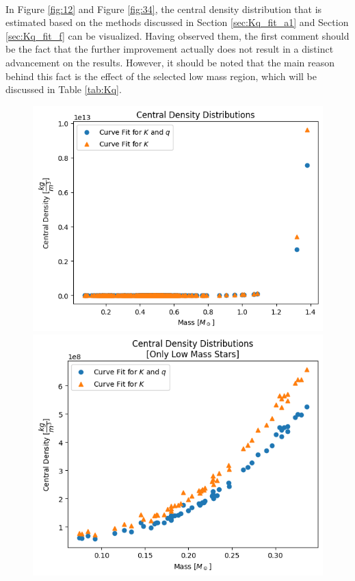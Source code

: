 \documentclass[letterpaper,12pt]{article}
\begin{document}
\paragraph{} In Figure \ref{fig:12} and Figure \ref{fig:34}, the central density distribution that is estimated based on the methods discussed in Section \ref{sec:Kq_fit_a1} and Section \ref{sec:Kq_fit_f} can be visualized. Having observed them, the first comment should be the fact that the further improvement actually does not result in a distinct advancement on the results. However, it should be noted that the main reason behind this fact is the effect of the selected low mass region, which will be discussed in Table \ref{tab:Kq}.

\begin{figure}[H]
\begin{minipage}{.5\textwidth}
\centerline{\includegraphics[width=\linewidth]{figures/3_n_s_rho_m.png}}
\end{minipage}
\begin{minipage}{.5\textwidth}
\centerline{\includegraphics[width=\linewidth]{figures/4_n_s_rho_m_.png}}

\end{minipage}
\end{figure}
\end{document}
